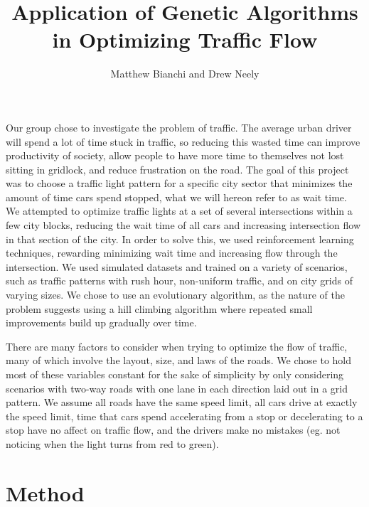 \documentclass[12pt, letterpaper]{article}
\title{Application of Genetic Algorithms in Optimizing Traffic Flow}
\author{Matthew Bianchi and Drew Neely}
\begin{document}
\maketitle

Our group chose to investigate the problem of traffic. 
The average urban driver will spend a lot of time stuck in traffic, so reducing this wasted time can improve productivity of society, allow people to have more time to themselves not lost sitting in gridlock, and reduce frustration on the road.
The goal of this project was to choose a traffic light pattern for a specific city sector that minimizes the amount of time cars spend stopped, what we will hereon refer to as wait time.
We attempted to optimize traffic lights at a set of several intersections within a few city blocks, reducing the wait time of all cars and increasing intersection flow in that section of the city. 
In order to solve this, we used reinforcement learning techniques, rewarding minimizing wait time and increasing flow through the intersection. 
We used simulated datasets and trained on a variety of scenarios, such as traffic patterns with rush hour, non-uniform traffic, and on city grids of varying sizes. 
We chose to use an evolutionary algorithm, as the nature of the problem suggests using a hill climbing algorithm where repeated small improvements build up gradually over time. 

There are many factors to consider when trying to optimize the flow of traffic, many of which involve the layout, size, and laws of the roads.
We chose to hold most of these variables constant for the sake of simplicity by only considering scenarios with two-way roads with one lane in each direction laid out in a grid pattern. 
We assume all roads have the same speed limit, all cars drive at exactly the speed limit, time that cars spend accelerating from a stop or decelerating to a stop have no affect on traffic flow, and the drivers make no mistakes (eg. not noticing when the light turns from red to green).

\section*{Method}
\end{document}
